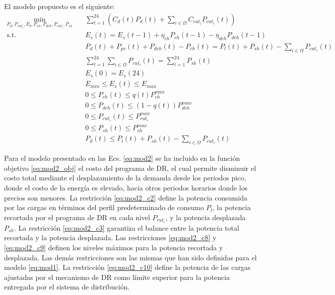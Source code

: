 El modelo propuesto es el siguiente:
\begin{subequations}
\begin{align}
	\min_{P_d,P_{cut_i},E_b,P_{ch},P_{dch},P_{cut_i},P_{sh}} \quad & \sum_{t=1}^{24} \left(C_d(t) P_d(t) + \sum_{i \in \Omega} C_{cut_i} P_{cut_i}(t)	\right)\label{eq:mod2_obj}\\
	\textrm{s.t.} \quad & E_s(t) = E_s(t-1) + \eta_{ch} P_{ch}(t-1) - \eta_{dch} P_{dch}(t-1)\label{eq:mod2_c1}\\
	& P_d(t) + P_{pv}(t) + P_{dch}(t) - P_{ch}(t) = P_l(t) + P_{sh}(t) - \sum_{i \in \Omega} P_{cut_i}(t)\label{eq:mod2_c2}\\
	& \sum_{t=1}^{24} \sum_{i \in \Omega} P_{cut_i}(t) = \sum_{t=1}^{24} P_{sh}(t)\label{eq:mod2_c3}\\
	& E_s(0) = E_s(24)\label{eq:mod2_c4}\\
	& E_{min} \leq E_s(t) \leq E_{max}\label{eq:mod2_c5}\\
	& 0 \leq P_{ch}(t) \leq q(t) P_{ch}^{max}\label{eq:mod2_c6}\\
	& 0 \leq P_{dch}(t) \leq (1-q(t)) P_{dch}^{max}\label{eq:mod2_c7}\\
	& 0 \leq P_{cut_i}(t) \leq P_{cut_i}^{max}\label{eq:mod2_c8}\\
	& 0 \leq P_{sh}(t) \leq P_{sh}^{max}\label{eq:mod2_c9}\\
	& P_d(t) \leq P_l(t) + P_{sh}(t) - \sum_{i \in \Omega} P_{cut_i}(t)\label{eq:mod2_c10}
\end{align}\label{eq:mod2}
\end{subequations}

Para el modelo presentado en las Ecs. \eqref{eq:mod2} se ha incluido en la función objetivo \eqref{eq:mod2_obj} el costo del programa de DR, el cual permite disminuir el costo total mediante el desplazamiento de la demanda desde los periodos pico, donde el costo de la energía es elevado, hacia otros periodos horarios donde los precios son menores. La restricción \eqref{eq:mod2_c2} define la potencia consumida por las cargas en términos del perfil predeterminado de consumo $P_l$, la potencia recortada por el programa de DR en cada nivel $P_{cut_i}$, y la potencia desplazada $P_{sh}$. La restricción \eqref{eq:mod2_c3} garantiza el balance entre la potencia total recortada y la potencia desplazada. Las restricciones \eqref{eq:mod2_c8} y \eqref{eq:mod2_c9} definen los niveles máximos para la potencia recortada y desplazada. Las demás restricciones son las mismas que han sido definidas para el modelo \eqref{eq:mod1}. La restricción \eqref{eq:mod2_c10} define la potencia de las cargas ajustadas por el mecanismo de DR como límite superior para la potencia entregada por el sistema de distribución.

